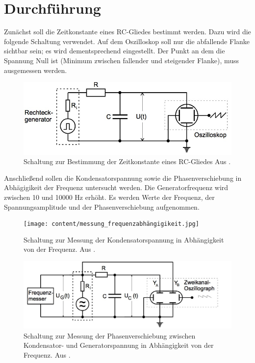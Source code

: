\section{Durchführung}
\label{sec:Durchführung}

 Zunächst soll die Zeitkonstante eines RC-Gliedes bestimmt werden. Dazu wird die folgende Schaltung verwendet. Auf dem Oszilloskop soll nur die abfallende Flanke sichtbar sein; es wird dementsprechend eingestellt. Der Punkt an dem die Spannung Null ist (Minimum zwischen fallender und steigender Flanke), muss ausgemessen werden.

 \begin{figure}
   \centering
   \includegraphics[scale=0.5]{content/messung_zeitkonstante.jpg}
   \caption{Schaltung zur Bestimmung der Zeitkonstante eines RC-Gliedes  Aus \cite{anleitung353}.}
   \label{fig:zeitkonstante}
 \end{figure}

Anschließend sollen die Kondensatorspannung sowie die Phasenverschiebung in Abhägigikeit der Frequenz untersucht werden. Die Generatorfrequenz wird zwischen 10 und 10000 \si{\Hz} erhöht. Es werden Werte der Frequenz, der Spannungsamplitude und der Phasenverschiebung aufgenommen.

\begin{figure}
  \centering
  \texttt{[image: content/messung\_frequenzabhängigikeit.jpg]}
  \caption{Schaltung zur Messung der Kondensatorspannung in Abhängigkeit von der Frequenz. Aus \cite{anleitung353}.}
  \label{fig:kondensatorspannung}
\end{figure}

\begin{figure}
  \centering
  \includegraphics[scale=0.5]{content/messung_phasenverschiebung.jpg}
  \caption{Schaltung zur Messung der Phasenverschiebung zwischen Kondensator- und Generatorspannung in Abhängigkeit von der Frequenz. Aus \cite{anleitung353}.}
  \label{fig:phase-frequenz}
\end{figure}

